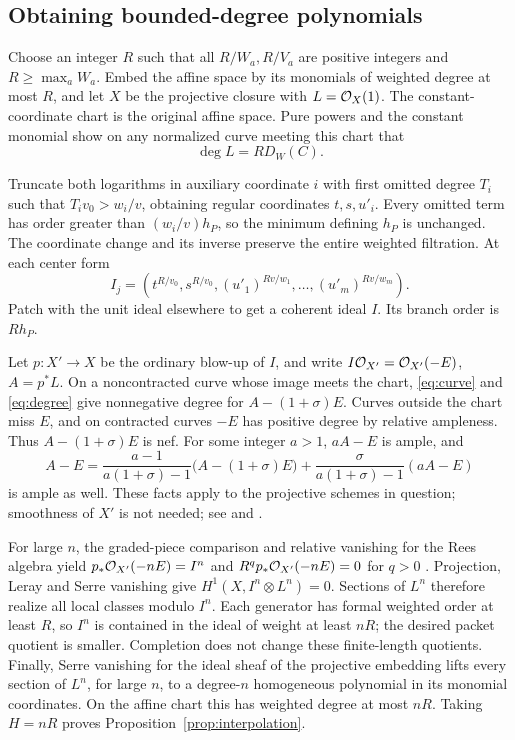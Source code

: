 \subsection{Obtaining bounded-degree polynomials}

Choose an integer \(R\) such that all \(R/W_a,R/V_a\) are positive
integers and \(R\geq\max_a W_a\). Embed the affine space by its monomials of weighted degree at
most \(R\), and let \(X\) be the projective closure with
\(L=\mathcal O_X(1)\). The constant-coordinate chart is the original affine
space. Pure powers and the constant monomial show on any normalized
curve meeting this chart that
\begin{equation}\label{eq:degree}
                          \deg L=R D_W(C).
\end{equation}

Truncate both logarithms in auxiliary coordinate \(i\) with first
omitted degree \(T_i\) such that \(T_iv_0>w_i/v\), obtaining regular
coordinates \(t,s,u'_i\). Every omitted term has order greater than
\((w_i/v)h_P\), so the minimum defining \(h_P\) is unchanged. The
coordinate change and its inverse preserve the entire weighted filtration.
At each center form
\[
 I_j=(t^{R/v_0},s^{R/v_0},(u'_1)^{Rv/w_1},\ldots,(u'_m)^{Rv/w_m}).
\]
Patch with the unit ideal elsewhere to get a coherent ideal \(I\).
Its branch order is \(Rh_P\).

Let \(p:X'\to X\) be the ordinary blow-up of \(I\), and write
\(I\mathcal O_{X'}=\mathcal O_{X'}(-E)\), \(A=p^*L\). On a noncontracted curve
whose image meets the chart, \eqref{eq:curve} and \eqref{eq:degree}
give nonnegative degree for \(A-(1+\sigma)E\). Curves outside the
chart miss \(E\), and on contracted curves \(-E\) has positive degree
by relative ampleness. Thus \(A-(1+\sigma)E\) is nef.
For some integer \(a>1\), \(aA-E\) is ample, and
\[
 A-E=\frac{a-1}{a(1+\sigma)-1}\bigl(A-(1+\sigma)E\bigr)
       +\frac{\sigma}{a(1+\sigma)-1}(aA-E)
\]
is ample as well. These facts apply to the projective schemes in question;
smoothness of \(X'\) is not needed; see \cite[Corollary 1.4.10]{Lazarsfeld}
and \cite{StacksBlowup}.

For large \(n\), the graded-piece comparison and relative vanishing
for the Rees algebra yield
\(p_*\mathcal O_{X'}(-nE)=I^n\) and
\(R^qp_*\mathcal O_{X'}(-nE)=0\) for \(q>0\)
\cite{StacksGraded,StacksComparison}. Projection, Leray and Serre
vanishing give \(H^1(X,I^n\otimes L^n)=0\). Sections of \(L^n\)
therefore realize all local classes modulo \(I^n\).
Each generator has formal weighted order at least \(R\), so \(I^n\)
is contained in the ideal of weight at least \(nR\); the desired packet
quotient is smaller. Completion does not change these finite-length
quotients. Finally, Serre vanishing for the ideal sheaf of the projective
embedding lifts every section of \(L^n\), for large \(n\), to a
degree-\(n\) homogeneous polynomial in its monomial coordinates. On the
affine chart this has weighted degree at most \(nR\).
Taking \(H=nR\) proves Proposition~\ref{prop:interpolation}.
